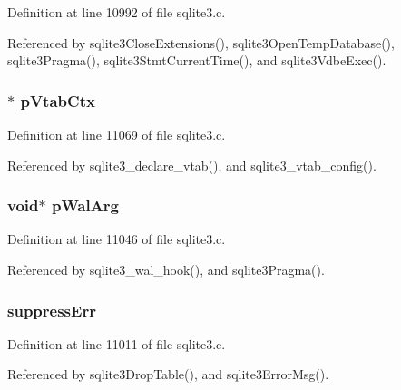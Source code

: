 Definition at line 10992 of file sqlite3.\+c.



Referenced by sqlite3\+Close\+Extensions(), sqlite3\+Open\+Temp\+Database(), sqlite3\+Pragma(), sqlite3\+Stmt\+Current\+Time(), and sqlite3\+Vdbe\+Exec().

\hypertarget{structsqlite3_a17aa2c40dd31d1e45686112aee5070c3}{}
\subsubsection[{p\+Vtab\+Ctx}]{$\ast$ p\+Vtab\+Ctx}\label{structsqlite3_a17aa2c40dd31d1e45686112aee5070c3}


Definition at line 11069 of file sqlite3.\+c.



Referenced by sqlite3\+\_\+declare\+\_\+vtab(), and sqlite3\+\_\+vtab\+\_\+config().

\hypertarget{structsqlite3_a0a4d7d85d57f7f8e186cafea4adfe9f8}{}
\subsubsection[{p\+Wal\+Arg}]{\setlength{\rightskip}{0pt plus 5cm}void$\ast$ p\+Wal\+Arg}\label{structsqlite3_a0a4d7d85d57f7f8e186cafea4adfe9f8}


Definition at line 11046 of file sqlite3.\+c.



Referenced by sqlite3\+\_\+wal\+\_\+hook(), and sqlite3\+Pragma().

\hypertarget{structsqlite3_ab10e0c324afa5887a991a919343f82e4}{}
\subsubsection[{suppress\+Err}]{ suppress\+Err}\label{structsqlite3_ab10e0c324afa5887a991a919343f82e4}


Definition at line 11011 of file sqlite3.\+c.



Referenced by sqlite3\+Drop\+Table(), and sqlite3\+Error\+Msg().

